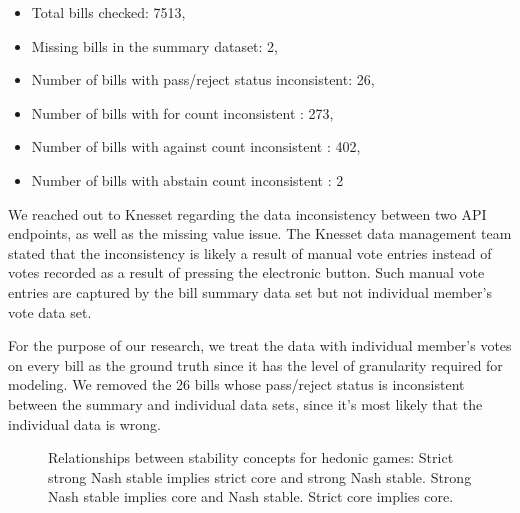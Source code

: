 \begin{itemize}
  \item Total bills checked: 7513,
  \item Missing bills in the summary dataset: 2,
  \item Number of bills with pass/reject status inconsistent: 26,
  \item Number of bills with for count inconsistent : 273,
  \item Number of bills with against count inconsistent : 402,
  \item Number of bills with abstain count inconsistent : 2
\end{itemize}

We reached out to Knesset regarding the data inconsistency between two API endpoints, as well as the missing value issue. The Knesset data management team stated that the inconsistency is likely a result of manual vote entries instead of votes recorded as a result of pressing the electronic button. Such manual vote entries are captured by the bill summary data set but not individual member's vote data set.

For the purpose of our research, we treat the data with individual member's votes on every bill as the ground truth since it has the level of granularity required for modeling. We removed the 26 bills whose pass/reject status is inconsistent between the summary and individual data sets, since it's most likely that the individual data is wrong.

\begin{figure}
\centering
{}
\caption{Relationships between stability concepts for hedonic games: Strict strong Nash stable implies strict core and strong Nash stable. Strong Nash stable implies core and Nash stable. Strict core implies core.}
\end{figure}
